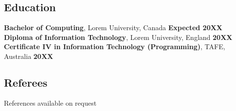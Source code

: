 \documentclass[10pt,a4paper]{article}
\begin{document}

\subsection*{\textcolor{accent}{\Large Education  \sout{\hfill}}} 

\textbf{Bachelor of Computing}, Lorem University, Canada \hfill \textbf{Expected 20XX}\\
\textbf{Diploma of Information Technology}, Lorem University, England \hfill \textbf{20XX}\\
\textbf{Certificate IV in Information Technology (Programming)}, TAFE, Australia \hfill \textbf{20XX}\\



\subsection*{\textcolor{accent}{\Large Referees  \sout{\hfill}}}
References available on request
\end{document}
